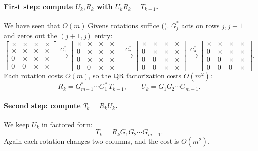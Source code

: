 \paragraph{First step: compute $U_k, R_k$ with $U_kR_k = T_{k-1}$.} We have seen that $O(m)$ Givens rotations suffice (). $G_j^\ast$ acts on rows $j, j+1$ and zeros out the $(j+1, j)$ entry:
\begin{equation}
  \begin{bmatrix} \times & \times & \times & \times \\ \times & \times & \times & \times \\ 0 & \times & \times & \times \\ 0 & 0 & \times & \times \end{bmatrix}
  \xrightarrow{\ G_1^\ast\ }
  \begin{bmatrix} \times & \times & \times & \times \\ 0 & \times & \times & \times \\ 0 & \times & \times & \times \\ 0 & 0 & \times & \times \end{bmatrix}
  \xrightarrow{\ G_2^\ast\ }
  \begin{bmatrix} \times & \times & \times & \times \\ 0 & \times & \times & \times \\ 0 & 0 & \times & \times \\ 0 & 0 & \times & \times \end{bmatrix}
  \xrightarrow{\ G_3^\ast\ }
  \begin{bmatrix} \times & \times & \times & \times \\ 0 & \times & \times & \times \\ 0 & 0 & \times & \times \\ 0 & 0 & 0 & \times \end{bmatrix}.
\end{equation}
Each rotation costs $O(m)$, so the QR factorization costs $O(m^2)$:
\begin{equation}
  R_k = G_{m-1}^\ast\cdots G_1^\ast\,T_{k-1}, \qquad U_k = G_1G_2\cdots G_{m-1}.
\end{equation}

\paragraph{Second step: compute $T_k = R_kU_k$.} We keep $U_k$ in factored form:
\begin{equation}
  T_k = R_kG_1G_2\cdots G_{m-1}.
\end{equation}
Again each rotation changes two columns, and the cost is $O(m^2)$.

